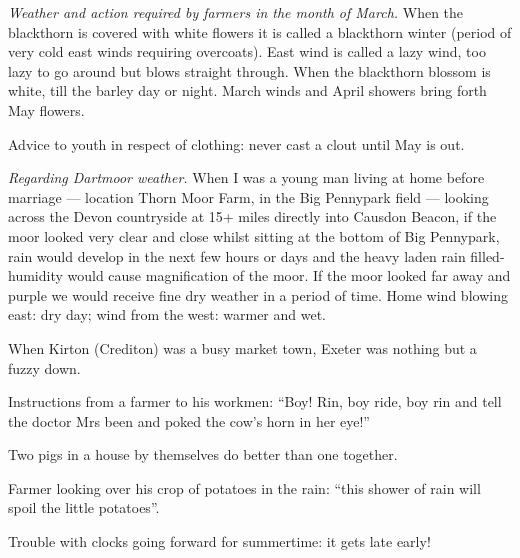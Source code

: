 

\emph{Weather and action required by farmers in the month of March.} When the
blackthorn is covered with white flowers it is called a blackthorn winter
(period of very cold east winds requiring overcoats). East wind is called a
lazy wind, too lazy to go around but blows straight through. When the
blackthorn blossom is white, till the barley day or night. March winds and
April showers bring forth May flowers.

\bigskip
\noindent Advice to youth in respect of clothing: never cast a clout until May
is out.

\bigskip
\noindent
\emph{Regarding Dartmoor weather.} When I was a young man living at home before
marriage --- location Thorn Moor Farm, in the Big Pennypark field --- looking
across the Devon countryside at 15+ miles directly into Causdon Beacon, if the
moor looked very clear and close whilst sitting at the bottom of Big
Pennypark, rain would develop in the next few hours or days and the heavy laden
rain filled-humidity would cause magnification of the moor. If the moor looked
far away and purple we would receive fine dry weather in a period of time. Home
wind blowing east: dry day; wind from the west: warmer and wet.

\bigskip
\noindent When Kirton (Crediton) was a busy market town, Exeter was nothing but
a fuzzy down.

\bigskip
\noindent Instructions from a farmer to his workmen: ``Boy! Rin, boy ride, boy
rin and tell the doctor Mrs been and poked the cow's horn in her eye!''

\bigskip
\noindent Two pigs in a house by themselves do better than one together.

\bigskip
\noindent Farmer looking over his crop of potatoes in the rain: ``this shower of
rain will spoil the little potatoes''.

\bigskip
\noindent Trouble with clocks going forward for summertime: it gets late early!
